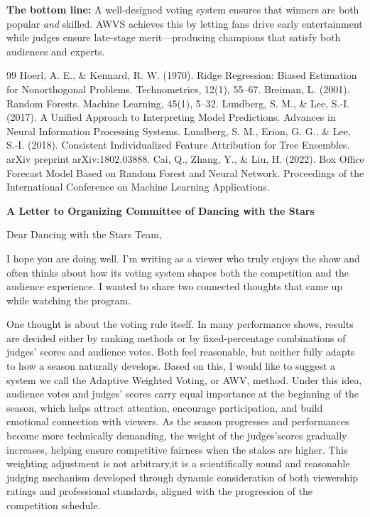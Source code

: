 \documentclass{mcmthesis}
\begin{document}
\textbf{The bottom line:} A well-designed voting system ensures that winners are both popular \textit{and} skilled. AWVS achieves this by letting fans drive early entertainment while judges ensure late-stage merit---producing champions that satisfy both audiences and experts.

\begin{thebibliography}{99}
Hoerl, A. E., \& Kennard, R. W. (1970).
Ridge Regression: Biased Estimation for Nonorthogonal Problems.
Technometrics, 12(1), 55--67.
Breiman, L. (2001).
Random Forests.
Machine Learning, 45(1), 5--32.
Lundberg, S. M., \& Lee, S.-I. (2017).
A Unified Approach to Interpreting Model Predictions.
Advances in Neural Information Processing Systems.
Lundberg, S. M., Erion, G. G., \& Lee, S.-I. (2018).
Consistent Individualized Feature Attribution for Tree Ensembles.
arXiv preprint arXiv:1802.03888.
Cai, Q., Zhang, Y., \& Liu, H. (2022).
Box Office Forecast Model Based on Random Forest and Neural Network.
Proceedings of the International Conference on Machine Learning Applications.
\end{thebibliography}

\newpage

\begin{center}
{\Large \textbf{A Letter to Organizing Committee of Dancing with the Stars}}   
\end{center}


\vspace{0.5cm}

\noindent 
Dear Dancing with the Stars Team,

I hope you are doing well. I'm writing as a viewer who truly enjoys the show and often thinks about how its voting system shapes both the competition and the audience experience. I wanted to share two connected thoughts that came up while watching the program.

One thought is about the voting rule itself. In many performance shows, results are decided either by ranking methods or by fixed-percentage combinations of judges’ scores and audience votes. Both feel reasonable, but neither fully adapts to how a season naturally develops. Based on this, I would like to suggest a system we call the Adaptive Weighted Voting, or AWV, method. Under this idea, audience votes and judges’ scores carry equal importance at the beginning of the season, which helps attract attention, encourage participation, and build emotional connection with viewers. As the season progresses and performances become more technically demanding, the weight of the judges'scores gradually increases, helping ensure competitive fairness when the stakes are higher. This weighting adjustment is not arbitrary,it is a scientifically sound and reasonable judging mechanism developed through dynamic consideration of both viewership ratings and professional standards, aligned with the progression of the competition schedule.
\end{document}

